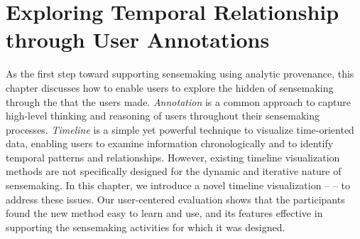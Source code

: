 \chapter{Exploring Temporal Relationship through User Annotations}
\label{chap:schemaline}

\graphicspath{{Chapter3/figures/}}

As the first step toward supporting sensemaking using analytic provenance, this chapter discusses how to enable users to explore the hidden  of sensemaking through the  that the users made. \emph{Annotation} is a common approach to capture high-level thinking and reasoning of users throughout their sensemaking processes. \emph{Timeline} is a simple yet powerful technique to visualize time-oriented data, enabling users to examine information chronologically and to identify temporal patterns and relationships. However, existing timeline visualization methods are not specifically designed for the dynamic and iterative nature of sensemaking. In this chapter, we introduce a novel timeline visualization -- \emph{} -- to address these issues. Our user-centered evaluation shows that the participants found the new method easy to learn and use, and its features effective in supporting the sensemaking activities for which it was designed.






